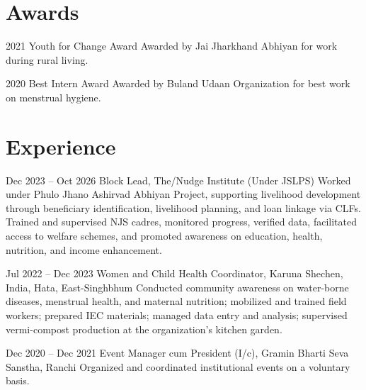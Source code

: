 \documentclass[A4]{twentysecondcv} %
\begin{document}
\section{Awards}

\begin{twenty}
    \twentyitem
	{2021}
	{Youth for Change Award}
	{}
	{Awarded by Jai Jharkhand Abhiyan for work during rural living.}

	\twentyitem
	{2020}
	{Best Intern Award}
	{}
	{Awarded by Buland Udaan Organization for best work on menstrual hygiene.}
\end{twenty}


\section{Experience}

\begin{twenty}

	\twentyitem
	{Dec 2023 -- Oct 2026}
	{Block Lead, The/Nudge Institute (Under JSLPS)}
	{}
	{Worked under Phulo Jhano Ashirvad Abhiyan Project, supporting livelihood development through beneficiary identification, livelihood planning, and loan linkage via CLFs. Trained and supervised NJS cadres, monitored progress, verified data, facilitated access to welfare schemes, and promoted awareness on education, health, nutrition, and income enhancement.}

	\twentyitem
	{Jul 2022 -- Dec 2023}
	{Women and Child Health Coordinator, Karuna Shechen, India, Hata, East-Singhbhum}
	{}
	{Conducted community awareness on water-borne diseases, menstrual health, and maternal nutrition; mobilized and trained field workers; prepared IEC materials; managed data entry and analysis; supervised vermi-compost production at the organization’s kitchen garden.}

	\twentyitem
	{Dec 2020 -- Dec 2021}
	{Event Manager cum President (I/c), Gramin Bharti Seva Sanstha, Ranchi}
	{}
	{Organized and coordinated institutional events on a voluntary basis.}

\end{twenty}
\end{document}
